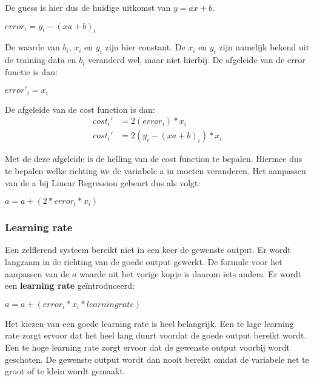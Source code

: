De guess is hier dus de huidige uitkomst van $ y = ax + b $.

\begin{center}
$ error_{i} = y_{i} - (xa + b)_{i}$
\end{center}

De waarde van $ b_{i} $, $ x_{i} $ en $ y_{i} $ zijn hier constant. De $ x_{i} $ en $ y_{i} $ zijn namelijk bekend uit de training data en $ b_{i} $ veranderd wel, maar niet hierbij. De afgeleide van de error functie is dan:

\begin{center}
$ error'_{i} = x_i$
\end{center}

De afgeleide van de cost function is dan:
\begin{align*}
cost_i' &= 2(error_i) * x_i \\
cost_i' &= 2(y_{i} - (xa + b)_{i}) * x_i
\end{align*}

Met de deze afgeleide is de helling van de cost function te bepalen. Hiermee dus te bepalen welke richting we de variabele a in moeten veranderen. Het aanpassen van de a bij Linear Regression gebeurt dus als volgt:

\begin{center}
$ a = a + (2 * error_i * x_i)$
\end{center}

\subsubsection{Learning rate}
Een zelflerend systeem bereikt niet in een keer de gewenste output. Er wordt langzaam in de richting van de goede output gewerkt. De formule voor het aanpassen van de $a$ waarde uit het vorige kopje is daarom iets anders. Er wordt een \textbf{learning rate} ge\"{i}ntroduceerd:

\begin{center}
$ a = a + (error_i * x_i * learning rate)$
\end{center}

Het kiezen van een goede learning rate is heel belangrijk. Een te lage learning rate zorgt ervoor dat het heel lang duurt voordat de goede output bereikt wordt. Een te hoge learning rate zorgt ervoor dat de gewenste output voorbij wordt geschoten. De gewenste output wordt dan nooit bereikt omdat de variabele net te groot of te klein wordt gemaakt. \cite{GradientDescent1}\cite{GradientDescent2}

